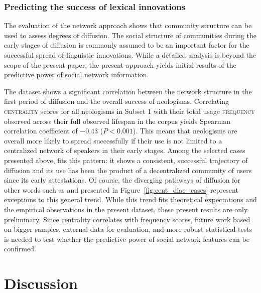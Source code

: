 \documentclass[
  a4paper,
  abstract=on,
  captions=tableabove
  ]{scrartcl}
\begin{document}
    \subsubsection{Predicting the success of lexical innovations}

      The evaluation of the network approach shows that community structure can be used to assess degrees of diffusion. The social structure of communities during the early stages of diffusion is commonly assumed to be an important factor for the successful spread of linguistic innovations. While a detailed analysis is beyond the scope of the present paper, the present approach yields initial results of the predictive power of social network information.

      The dataset shows a significant correlation between the network structure in the first period of diffusion and the overall success of neologisms. Correlating \textsc{centrality} scores for all neologisms in Subset 1 with their total usage \textsc{frequency} observed across their full observed lifespan in the corpus yields Spearman correlation coefficient of \num{-0.43} (${P < 0.001}$). This means that neologisms are overall more likely to spread successfully if their use is not limited to a centralized network of speakers in their early stages. Among the selected cases presented above,  fits this pattern: it shows a consistent, successful trajectory of diffusion and its use has been the product of a decentralized community of users since its early attestations. Of course, the diverging pathways of diffusion for other words such as  and  presented in Figure~\ref{fig:cent_diac_cases} represent exceptions to this general trend. While this trend fits theoretical expectations and the empirical observations in the present dataset, these present results are only preliminary. Since centrality correlates with frequency scores, future work based on bigger samples, external data for evaluation, and more robust statistical tests is needed to test whether the predictive power of social network features can be confirmed.

\section{Discussion}
  \label{sec:discussion}
\end{document}
